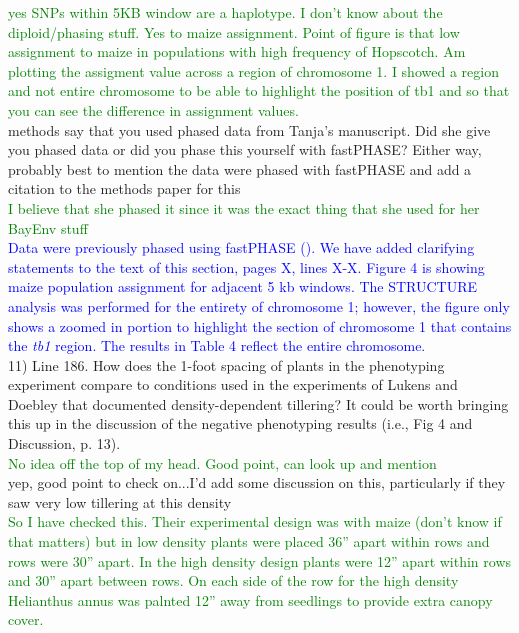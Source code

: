 \documentclass[11pt]{article}
\newcommand{\res}[1]{\noindent \textcolor{blue}{{#1}} \\}
\newcommand{\lev}[1]{\noindent \textcolor{green}{{#1}} \\}
\newcommand{\mbh}[1]{\noindent \textcolor{Dandelion}{{#1}}\\}
\begin{document}
\lev{yes SNPs within 5KB window are a haplotype. I don't know about the diploid/phasing stuff. Yes to maize assignment. Point of figure is that low assignment to maize in populations with high frequency of Hopscotch. Am plotting the assigment value across a region of chromosome 1. I showed a region and not entire chromosome to be able to highlight the position of tb1 and so that you can see the difference in assignment values.}

\mbh{methods say that you used phased data from Tanja's manuscript.  Did she give you phased data or did you phase this yourself with fastPHASE?  Either way, probably best to mention the data were phased with fastPHASE and add a citation to the methods paper for this}

\lev{I believe that she phased it since it was the exact thing that she used for her BayEnv stuff}

\res{Data were previously phased using fastPHASE (\lef{cite tanja and fastPHASE paper}). We have added clarifying statements to the text of this section, pages X, lines X-X. Figure 4 is showing maize population assignment for adjacent 5 kb windows. The STRUCTURE analysis was performed for the entirety of chromosome 1; however, the figure only shows a zoomed in portion to highlight the section of chromosome 1 that contains the \emph{tb1} region. The results in Table 4 reflect the entire chromosome.}

11) Line 186. How does the 1-foot spacing of plants in the phenotyping experiment compare to conditions used in the experiments of Lukens and Doebley that documented density-dependent tillering? It could be worth bringing this up in the discussion of the negative phenotyping results (i.e., Fig 4 and Discussion, p. 13). \\

\lev{No idea off the top of my head. Good point, can look up and mention}

\mbh{yep, good point to check on...I'd add some discussion on this, particularly if they saw very low tillering at this density}

\lev{So I have checked this. Their experimental design was with maize (don't know if that matters) but in low density plants were placed 36'' apart within rows and rows were 30'' apart. In the high density design plants were 12'' apart within rows and 30'' apart between rows. On each side of the row for the high density Helianthus annus was palnted 12'' away from seedlings to provide extra canopy cover.}
\end{document}
